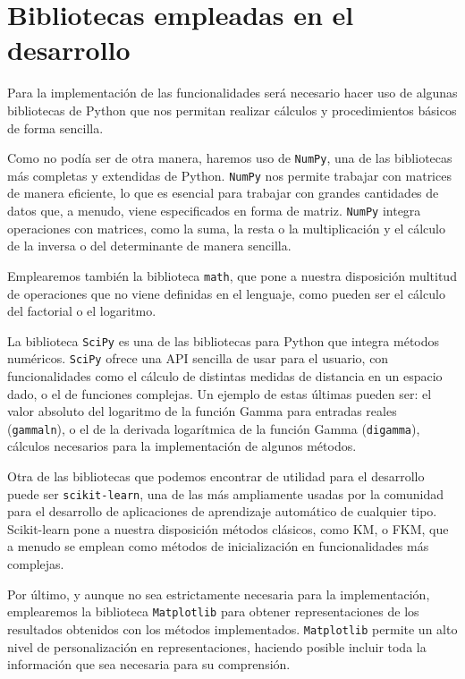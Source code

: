 \section{Bibliotecas empleadas en el desarrollo}

Para la implementación de las funcionalidades será necesario hacer uso de algunas bibliotecas de Python que nos permitan realizar cálculos y procedimientos básicos de forma sencilla.

Como no podía ser de otra manera, haremos uso de \texttt{NumPy}, una de las bibliotecas más completas y  extendidas de Python. \texttt{NumPy} nos permite trabajar con matrices de manera eficiente, lo que es esencial para trabajar con grandes cantidades de datos que, a menudo, viene especificados en forma de matriz. \texttt{NumPy} integra operaciones con matrices, como la suma, la resta o la multiplicación y el cálculo de la inversa o del determinante de manera sencilla.

Emplearemos también la biblioteca \texttt{math}, que pone a nuestra disposición multitud de operaciones que no viene definidas en el lenguaje, como pueden ser el cálculo del factorial o el logaritmo.

La biblioteca \texttt{SciPy} es una de las bibliotecas para Python que integra métodos numéricos. \texttt{SciPy} ofrece una API sencilla de usar para el usuario, con funcionalidades como el cálculo de distintas medidas de distancia en un espacio dado, o el de funciones complejas. Un ejemplo de estas últimas pueden ser: el valor absoluto del logaritmo de la función Gamma para entradas reales (\texttt{gammaln}), o el de la derivada logarítmica de la función Gamma (\texttt{digamma}), cálculos necesarios para la implementación de algunos métodos.

Otra de las bibliotecas que podemos encontrar de utilidad para el desarrollo puede ser \texttt{scikit-learn}, una de las más ampliamente usadas por la comunidad para el desarrollo de aplicaciones de aprendizaje automático de cualquier tipo. Scikit-learn pone a nuestra disposición métodos clásicos, como \acf{KM}, o \acf{FKM}, que a menudo se emplean como métodos de inicialización en funcionalidades más complejas.

Por último, y aunque no sea estrictamente necesaria para la implementación, emplearemos la biblioteca \texttt{Matplotlib} para obtener representaciones de los resultados obtenidos con los métodos implementados. \texttt{Matplotlib} permite un alto nivel de personalización en representaciones, haciendo posible incluir toda la información que sea necesaria para su comprensión. 

